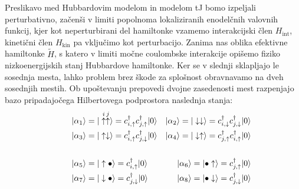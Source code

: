 \documentclass[10pt,a4paper]{article}
\begin{document}
Preslikavo med Hubbardovim modelom in modelom tJ bomo izpeljali perturbativno, začenši v limiti popolnoma lokaliziranih enodelčnih valovnih funkcij, kjer kot neperturbirani del hamiltonke vzamemo interakcijski člen $H_\mathrm{int}$, kinetični člen $H_\mathrm{kin}$ pa vključimo kot perturbacijo. Zanima nas oblika efektivne hamiltonke $\tilde{H}$, s katero v limiti močne coulombske interakcije opišemo fiziko nizkoenergijskih stanj Hubbardove hamiltonke. Ker se v slednji sklapljajo le sosednja mesta, lahko problem brez škode za splošnost obravnavamo na dveh sosednjih mestih. Ob upoštevanju prepovedi dvojne zasedenosti mest razpenjajo bazo pripadajočega Hilbertovega podprostora naslednja stanja:
\begin{equation}\label{eq:stanja}
\begin{aligned}\qquad
&\vert\alpha_1\rangle= \vert  \overset{i}{\uparrow} \overset{j}{\uparrow}\rangle=c^\dagger_{i,\uparrow}c^\dagger_{j,\uparrow}\vert0\rangle & \vert\alpha_2\rangle=\vert \downarrow \downarrow\rangle=c^\dagger_{i,\downarrow}c^\dagger_{j,\downarrow}\vert0\rangle\\
&\vert\alpha_3\rangle=\vert \uparrow \downarrow \rangle=c^\dagger_{i,\uparrow}c^\dagger_{j,\downarrow}\vert0\rangle &\vert\alpha_4\rangle=\vert \downarrow \uparrow \rangle=c^\dagger_{j,\uparrow}c^\dagger_{i,\uparrow}\vert0\rangle \\\\
&\vert\alpha_5\rangle= \vert\uparrow \bullet\rangle=c^\dagger_{i,\uparrow}\vert0\rangle &\vert\alpha_6\rangle=\vert \bullet  \uparrow\rangle=c^\dagger_{j,\uparrow}\vert0\rangle\\
&\vert\alpha_7\rangle=\vert\downarrow \bullet\rangle=c^\dagger_{j,\downarrow}\vert0\rangle&\vert\alpha_8\rangle=\vert \bullet  \downarrow \rangle=c^\dagger_{j,\downarrow}\vert0\rangle\\
\end{aligned}
\end{equation}
\end{document}
